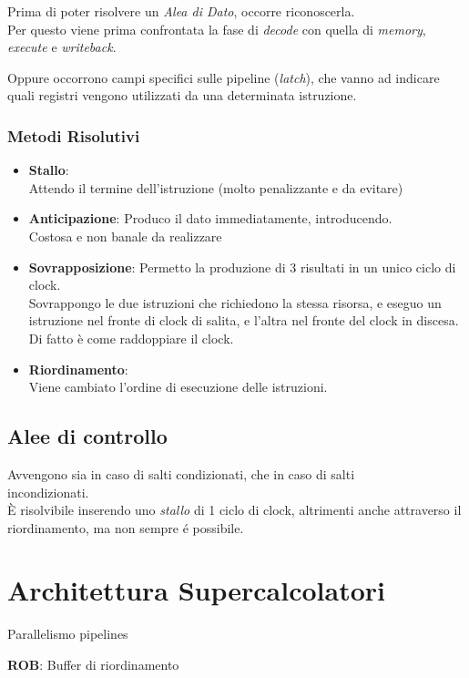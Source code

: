 \documentclass[a4paper,10pt]{article}
\begin{document}
Prima di poter risolvere un \textit{Alea di Dato}, occorre riconoscerla.
\\
Per questo viene prima confrontata la fase di \textit{decode} con quella di \textit{memory}, \textit{execute} e \textit{writeback}.

Oppure occorrono campi specifici sulle pipeline (\textit{latch}), che vanno ad indicare quali registri vengono utilizzati da una determinata istruzione.

\subsubsection{Metodi Risolutivi}
\begin{itemize}
    \item \textbf{Stallo}:
        \\
        Attendo il termine dell'istruzione (molto penalizzante e da evitare)
    \item \textbf{Anticipazione}:
        Produco il dato immediatamente, introducendo.
        \\
        Costosa e non banale da realizzare
    \item \textbf{Sovrapposizione}:
        Permetto la produzione di 3 risultati in un unico ciclo di clock.
        \\
        Sovrappongo le due istruzioni che richiedono la stessa risorsa, e eseguo un istruzione nel fronte di clock di salita,
        e l'altra nel fronte del clock in discesa.
        \\
        Di fatto è come raddoppiare il clock.

    \item \textbf{Riordinamento}:
        \\
        Viene cambiato l'ordine di esecuzione delle istruzioni.

\end{itemize}

\subsection{Alee di controllo}
Avvengono sia in caso di salti condizionati, che in caso di salti\\ incondizionati.
\\
È risolvibile inserendo uno \textit{stallo} di 1 ciclo di clock, altrimenti anche attraverso il riordinamento, ma non sempre é possibile.


\section{Architettura Supercalcolatori}
Parallelismo pipelines

\textbf{ROB}: Buffer di riordinamento





\end{document}
